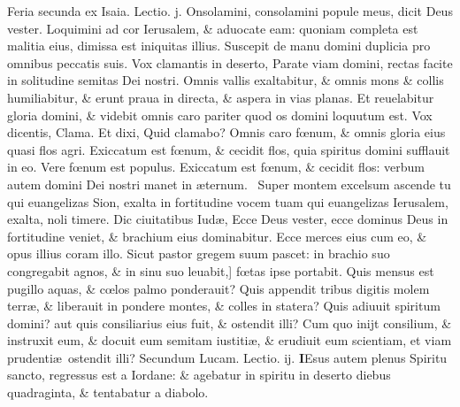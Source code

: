 \documentclass[a5paper,10pt]{book}
\def\leftmarginnote{%
	\lrmarginnote{\hskip -\marginparsep \hskip -6.5em}}
\def\rightmarginnote{%
	\lrmarginnote{\hskip\columnwidth \hskip -1em}}
\def\ae{æ}
\def\oe{œ}
\begin{document}
\begin{multicols*}{2}
\newline {} \color{red} \hypertarget{MON-SECUNDA-ADV}{Feria secunda} ex Isaia. \hfill Lectio. j. \color{black}
\vspace{-.25em}
Onsolamini,\leftmarginnote{\begin{flushright}c. 40.\end{flushright}} consolamini popule meus, dicit Deus vester.
Loquimini ad cor Ierusalem, \& aduocate eam: quoniam completa est malitia eius, dimissa est iniquitas illius.
Suscepit de manu domini duplicia pro omnibus peccatis suis.
Vox clamantis in deserto, Parate viam domini, rectas facite in solitudine semitas Dei nostri.
Omnis vallis exaltabitur, \& omnis mons \& collis humiliabitur, \& erunt praua in directa, \& aspera in vias planas.
Et reuelabitur gloria domini, \& videbit omnis caro pariter quod os domini loquutum est.
Vox dicentis, Clama. Et dixi, Quid clamabo?
Omnis caro f\oe num, \& omnis gloria eius quasi flos agri.
Exiccatum est f\oe num, \& cecidit flos, quia spiritus domini sufflauit in eo.
Vere f\oe num est populus. Exiccatum est f\oe num, \& cecidit flos: verbum autem domini Dei nostri manet in \ae ternum. \textdagger \ 
Super\leftmarginnote{\begin{flushright}B\end{flushright}} montem excelsum ascende tu qui euangelizas Sion, exalta in fortitudine vocem tuam qui euangelizas Ierusalem, exalta, noli timere.
Dic ciuitatibus Iud\ae , Ecce Deus vester, ecce dominus Deus in fortitudine veniet, \& brachium eius dominabitur.
Ecce merces eius cum eo, \& opus illius coram illo.
Sicut pastor gregem suum pascet: in brachio suo congregabit agnos, \& in sinu suo leuabit,] f\oe tas\leftmarginnote{\begin{flushright}C\end{flushright}} ipse portabit.
Quis mensus est pugillo aquas, \& c\oe los palmo ponderauit?
Quis appendit tribus digitis molem terr\ae , \& liberauit in pondere montes, \& colles in statera?
Quis adiuuit spiritum domini? aut quis consiliarius eius fuit, \& ostendit illi?
Cum quo inijt consilium, \& instruxit eum, \& docuit eum semitam iustiti\ae , \& erudiuit eum scientiam, et viam prudenti\ae \ ostendit illi?
\newline \color{red} Secundum Lucam. \hfill Lectio. ij. \color{black}
\vspace{-.25em}
\lettrine[lines=2]{\bfseries \color{red} I}{}Esus\rightmarginnote{ca. 4.} autem plenus Spiritu sancto, regressus est a Iordane: \& agebatur in spiritu in deserto diebus quadraginta, \& tentabatur a diabolo.

\end{multicols*}
\end{document}
